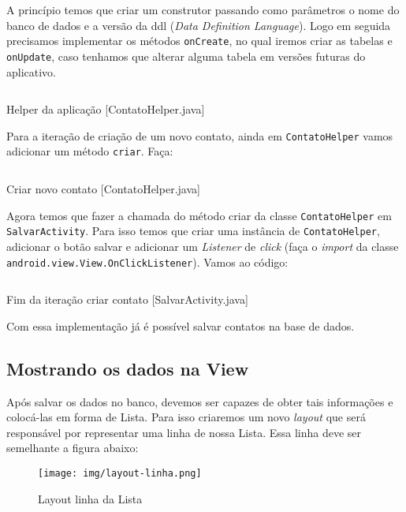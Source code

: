 A princípio temos que criar um construtor passando como parâmetros o
nome do banco de dados e a versão da \gls{ddl} (\emph{Data Definition
Language}). Logo em seguida precisamos implementar os métodos
\texttt{onCreate}, no qual iremos criar as tabelas e \texttt{onUpdate},
caso tenhamos que alterar alguma tabela em versões futuras do
aplicativo.

\begin{listing}[H]
  \inputminted[linenos=true,frame=bottomline,tabsize=3]{ java }{ source/ContatoHelper-1.java }
  \caption{Helper da aplicação [ContatoHelper.java]}
\end{listing}

Para a iteração de criação de um novo contato, ainda em
\texttt{ContatoHelper} vamos adicionar um método \texttt{criar}. Faça:

\begin{listing}[H]
  \inputminted[linenos=true,frame=bottomline,tabsize=3]{ java }{ source/ContatoHelper-2.java }
  \caption{Criar novo contato [ContatoHelper.java]}
\end{listing}

Agora temos que fazer a chamada do método criar da classe
\texttt{ContatoHelper} em \texttt{SalvarActivity}. Para isso temos que
criar uma instância de \texttt{ContatoHelper}, adicionar o botão salvar
e adicionar um \emph{Listener} de \emph{click} (faça o \emph{import} da
classe \newline
\texttt{android.view.View.OnClickListener}). Vamos ao código:

\begin{listing}[H]
  \inputminted[linenos=true,frame=bottomline,tabsize=3]{ java }{ source/SalvarActivity-2.java }
  \caption{Fim da iteração criar contato [SalvarActivity.java]}
\end{listing}

Com essa implementação já é possível salvar contatos na base de dados.

\subsection{Mostrando os dados na View \label{ssec:listview}}

Após salvar os dados no banco, devemos ser capazes de obter tais
informações e colocá-las em forma de Lista. Para isso criaremos um novo
\emph{layout} que será responsável por representar uma linha de nossa
Lista. Essa linha deve ser semelhante a figura abaixo:

\begin{figure}[h]
    \centering
    \texttt{[image: img/layout-linha.png]}
    \caption{Layout linha da Lista}
\end{figure}

